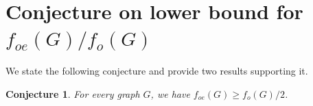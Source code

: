 \documentclass{article}
\newcommand{\2}{\vspace{0.2cm}}
\newtheorem{theorem}{Theorem}[section]
\newtheorem{proposition}[theorem]{Proposition}
\newtheorem{lemma}[theorem]{Lemma}
\newtheorem{conjecture}[theorem]{Conjecture}
\begin{document}



\section{Conjecture on lower bound for $f_{oe}(G)/f_o(G)$}\label{sec:conj}

We state the following conjecture and provide two results supporting it. 

\begin{conjecture}\label{conj:half}
For every graph $G$, we have $f_{oe}(G)\ge f_o(G)/2$.
\end{conjecture}



\end{document}

